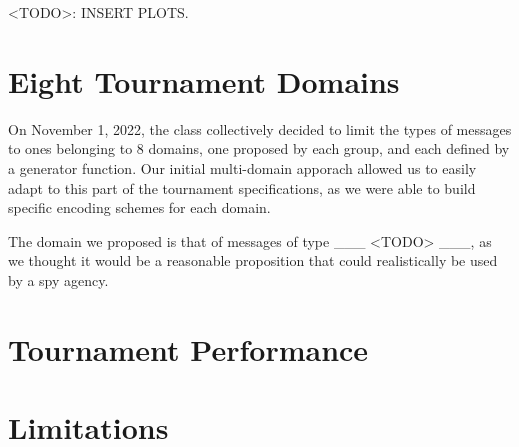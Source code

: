 \documentclass{article}
\begin{document}
<TODO>: INSERT PLOTS.

\section{Eight Tournament Domains}

On November 1, 2022, the class collectively decided to limit the types of messages to ones belonging to 8 domains, one proposed by each group, and each defined by a generator function. Our initial multi-domain apporach allowed us to easily adapt to this part of the tournament specifications, as we were able to build specific encoding schemes for each domain.

The domain we proposed is that of messages of type \_\_\_ <TODO> \_\_\_, as we thought it would be a reasonable proposition that could realistically be used by a spy agency.

\section{Tournament Performance}

\section{Limitations}


    
\end{document}
